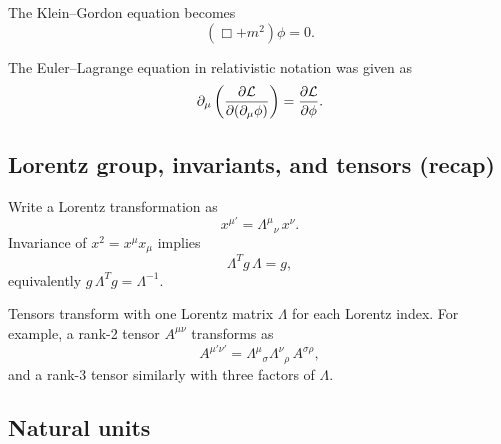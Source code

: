 The Klein--Gordon equation becomes
\begin{equation}
  (\Box + m^2)\phi = 0.
  \label{eq:lec02:KG-box}
\end{equation}

The Euler--Lagrange equation in relativistic notation was given as
\begin{equation}
  \partial_\mu\left(\frac{\partial \mathcal{L}}{\partial(\partial_\mu\phi)}\right)
  = \frac{\partial \mathcal{L}}{\partial\phi}.
  \label{eq:lec02:EL-covariant}
\end{equation}

\subsection*{Lorentz group, invariants, and tensors (recap)}

Write a Lorentz transformation as
\begin{equation}
  x^{\mu'} = \Lambda^{\mu}{}_{\nu}\,x^\nu.
  \label{eq:lec02:lorentz-transform}
\end{equation}
Invariance of \(x^2=x^\mu x_\mu\) implies
\begin{equation}
  \Lambda^{T} g\,\Lambda = g,
  \label{eq:lec02:Lorentz-condition}
\end{equation}
equivalently \(g\,\Lambda^T g = \Lambda^{-1}\).


\begin{remark}
Tensors transform with one Lorentz matrix \(\Lambda\) for each Lorentz
index. For example, a rank-2 tensor \(A^{\mu\nu}\) transforms as
\begin{equation}
  A^{\mu'\nu'} = \Lambda^{\mu}{}_{\sigma}\Lambda^{\nu}{}_{\rho}\,A^{\sigma\rho},
  \label{eq:lec02:tensor-transform}
\end{equation}
and a rank-3 tensor similarly with three factors of \(\Lambda\).
\end{remark}

\subsection*{Natural units}

